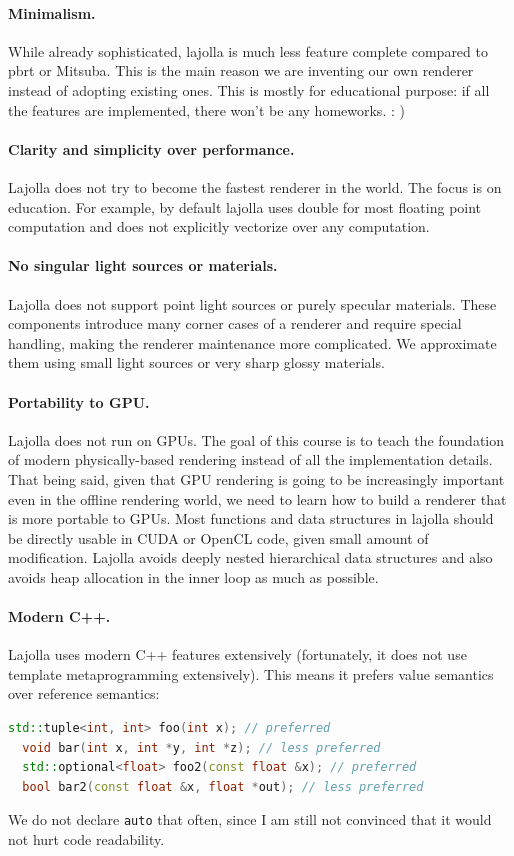 \documentclass{article}
\begin{document}
\paragraph{Minimalism.} While already sophisticated, lajolla is much less feature complete compared to pbrt or Mitsuba. This is the main reason we are inventing our own renderer instead of adopting existing ones. This is mostly for educational purpose: if all the features are implemented, there won't be any homeworks. : )

\paragraph{Clarity and simplicity over performance.} Lajolla does not try to become the fastest renderer in the world. The focus is on education. For example, by default lajolla uses double for most floating point computation and does not explicitly vectorize over any computation.

\paragraph{No singular light sources or materials.} Lajolla does not support point light sources or purely specular materials. These components introduce many corner cases of a renderer and require special handling, making the renderer maintenance more complicated. We approximate them using small light sources or very sharp glossy materials.

\paragraph{Portability to GPU.} Lajolla does not run on GPUs. The goal of this course is to teach the foundation of modern physically-based rendering instead of all the implementation details. That being said, given that GPU rendering is going to be increasingly important even in the offline rendering world, we need to learn how to build a renderer that is more portable to GPUs. Most functions and data structures in lajolla should be directly usable in CUDA or OpenCL code, given small amount of modification. Lajolla avoids deeply nested hierarchical data structures and also avoids heap allocation in the inner loop as much as possible.

\paragraph{Modern C++.} Lajolla uses modern C++ features extensively (fortunately, it does not use template metaprogramming extensively). This means it prefers value semantics over reference semantics:
\begin{lstlisting}[language=C++]
  std::tuple<int, int> foo(int x); // preferred
  void bar(int x, int *y, int *z); // less preferred
  std::optional<float> foo2(const float &x); // preferred
  bool bar2(const float &x, float *out); // less preferred
\end{lstlisting}
We do not declare \lstinline{auto} that often, since I am still not convinced that it would not hurt code readability.
\end{document}
